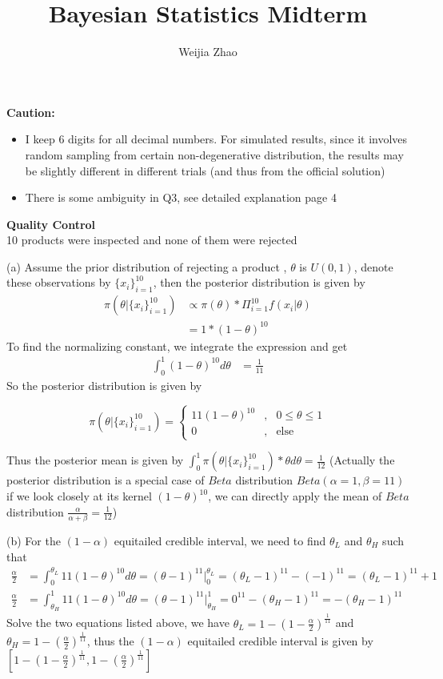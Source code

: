 \documentclass{homeworg}
\title{Bayesian Statistics Midterm}
\author{Weijia Zhao}
\begin{document}
\maketitle

\textbf{Caution:}
\begin{itemize}
\item  I keep 6 digits for all decimal numbers. For simulated results, since it involves random sampling from
certain non-degenerative distribution, the results may be slightly different in different trials (and thus from the official solution)
\item There is some ambiguity in Q3, see detailed explanation page 4

\end{itemize}

\exercise 
\textbf{Quality Control} \\
10 products were inspected and none of them were rejected

(a) Assume the prior distribution of rejecting a product , $\theta$ is $U(0,1)$, denote these observations by $\{x_i\}_{i=1}^{10}$, then the posterior distribution is given by 
\begin{align*}
\pi(\theta|\{x_i\}_{i=1}^{10})& \propto \pi(\theta)*\Pi_{i=1}^{10}f(x_i| \theta)\\
&=1*(1-\theta)^{10}
\end{align*}
To find the normalizing constant, we integrate the expression and get 
\begin{align*}
\int_{0}^{1} (1-\theta)^{10} d\theta &= \frac{1}{11}
\end{align*}
So the posterior distribution is given by

$$ \pi(\theta|\{x_i\}_{i=1}^{10})=\left\{
\begin{aligned}
11(1-\theta)^{10} &, & 0 \leq \theta \leq 1\\
0 &,& \text{else}
\end{aligned}
\right.
$$

Thus the posterior mean is given by $\int_{0}^{1}\pi(\theta|\{x_i\}_{i=1}^{10}) *\theta d\theta=\frac{1}{12}$ (Actually the posterior distribution is a special case of $Beta$ distribution $Beta(\alpha=1,\beta=11)$ if we look closely at its kernel $(1-\theta)^{10}$, we can directly apply the mean of $Beta$ distribution $\frac{\alpha}{\alpha+\beta}=\frac{1}{12}$)

(b) For the $(1-\alpha)$ equitailed credible interval, we need to find $\theta_L$ and $\theta_H$ such that 
\begin{align*}
\frac{\alpha}{2}&=\int_{0}^{\theta_L}11(1-\theta)^{10}d\theta =(\theta-1)^{11}|_{0}^{\theta_L}=(\theta_L-1)^{11}-(-1)^{11}=(\theta_L-1)^{11}+1\\
\frac{\alpha}{2}&=\int_{\theta_H}^{1}11(1-\theta)^{10}d\theta=(\theta-1)^{11}|_{\theta_H}^1=0^{11}-(\theta_H-1)^{11}=-(\theta_H-1)^{11}
\end{align*}
Solve the two equations listed above, we have $\theta_L=1-(1-\frac{\alpha}{2})^{\frac{1}{11}}$ and $\theta_H=1-(\frac{\alpha}{2})^{\frac{1}{11}}$, thus the $(1-\alpha)$ equitailed credible interval is given by $[1-(1-\frac{\alpha}{2})^{\frac{1}{11}}, 1-(\frac{\alpha}{2})^{\frac{1}{11}}]$
\end{document}
